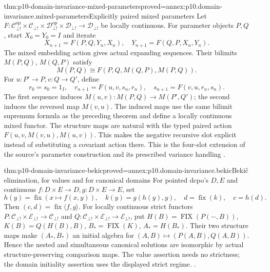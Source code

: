 \begin{hbtheorem}{thm:p10-domain-invariance-mixed-parameters}{proved=annex:p10.domain-invariance.mixed-parameters}{Explicitly paired mixed parameters}
Let \(F:\mathcal C_{\bot!}^{\mathrm{op}}\times
\mathcal C_{\bot!}\times\mathcal D_{\bot!}^{\mathrm{op}}
\times\mathcal D_{\bot!}\to\mathcal D_{\bot!}\) be locally
continuous. For parameter objects \(P,Q\), start \(X_0=Y_0=I\)
and iterate
\[
 X_{n+1}=F(P,Q,Y_n,X_n),\quad
 Y_{n+1}=F(Q,P,X_n,Y_n).
\]
The mixed embedding action gives actual expanding sequences.
Their bilimits \(M(P,Q)\), \(M(Q,P)\) satisfy
\[
 M(P,Q)\cong F(P,Q,M(Q,P),M(P,Q)).
\]
For \(u:P'\to P,v:Q\to Q'\), define
\[
 r_0=s_0=1_I,\quad
 r_{n+1}=F(u,v,s_n,r_n),\quad
 s_{n+1}=F(v,u,r_n,s_n).
\]
The first sequence induces \(M(u,v):M(P,Q)\to M(P',Q')\);
the second induces the reversed map \(M(v,u)\).
The induced maps use the same bilimit supremum formula as the
preceding theorem and define a locally continuous mixed functor.
The structure maps are natural with the typed paired action
\(F(u,v,M(v,u),M(u,v))\). This makes the negative recursive
slot explicit instead of substituting a covariant action there.
This is the four-slot extension of the source's parameter
construction and its prescribed variance handling
\cite[pp.~72--74; Exercise~5.4.11(9), p.~84]
{AbramskyJungCorrectedExpandedDomainTheory}.
\end{hbtheorem}

\begin{hbtheorem}{thm:p10-domain-invariance-bekic}{proved=annex:p10.domain-invariance.bekic}{Beki\v c elimination, for values and for canonical domains}
For pointed dcpo's \(D,E\) and continuous
\(f:D\times E\to D,g:D\times E\to E\), set
\[
 h(y)=\operatorname{fix}(x\mapsto f(x,y)),\quad
 k(y)=g(h(y),y),\quad d=\operatorname{fix}(k),\quad c=h(d).
\]
Then \((c,d)=\operatorname{fix}\langle f,g\rangle\).
For locally continuous strict functors
\(P:\mathcal C_{\bot!}\times\mathcal E_{\bot!}\to\mathcal C_{\bot!}\)
and \(Q:\mathcal C_{\bot!}\times\mathcal E_{\bot!}\to\mathcal E_{\bot!}\),
put \(H(B)=\operatorname{FIX}(P(-,B))\),
\(K(B)=Q(H(B),B)\), \(B_* =\operatorname{FIX}(K)\),
\(A_*=H(B_*)\). Their two structure maps make \((A_*,B_*)\)
an initial algebra for \((A,B)\mapsto(P(A,B),Q(A,B))\).
Hence the nested and simultaneous canonical solutions are
isomorphic by actual structure-preserving comparison maps.
The value assertion needs no strictness; the domain initiality
assertion uses the displayed strict regime.
\cite[pp.~73--74; Exercise~5.4.11(4), p.~83]
{AbramskyJungCorrectedExpandedDomainTheory}.
\end{hbtheorem}

